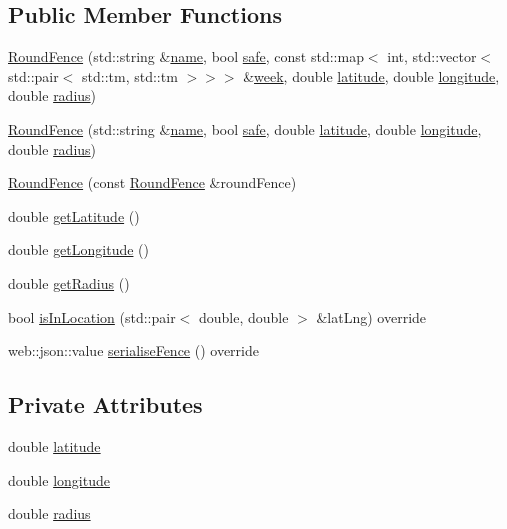 \subsection*{Public Member Functions}
\begin{DoxyCompactItemize}
\item 
\hyperlink{class_round_fence_afd452f0c483dbe4b328fc56723ae953c}{Round\+Fence} (std\+::string \&\hyperlink{class_fence_aa405676733f25812b38ea0dd9ccd1863}{name}, bool \hyperlink{class_fence_ad570430040eee657c625a67d5589c4b5}{safe}, const std\+::map$<$ int, std\+::vector$<$ std\+::pair$<$ std\+::tm, std\+::tm $>$$>$$>$ \&\hyperlink{class_fence_ae589e973fa03316847aeceedd72e2b64}{week}, double \hyperlink{class_round_fence_ad48cb4c95dab320652679bae203b7caf}{latitude}, double \hyperlink{class_round_fence_a122cccc61f294c1fcdf7ebe944944fca}{longitude}, double \hyperlink{class_round_fence_a8e9d1a2f22df0bb718522f3ab6cd3b83}{radius})
\item 
\hyperlink{class_round_fence_a99f4ab4cedbec39596633826e101f3d7}{Round\+Fence} (std\+::string \&\hyperlink{class_fence_aa405676733f25812b38ea0dd9ccd1863}{name}, bool \hyperlink{class_fence_ad570430040eee657c625a67d5589c4b5}{safe}, double \hyperlink{class_round_fence_ad48cb4c95dab320652679bae203b7caf}{latitude}, double \hyperlink{class_round_fence_a122cccc61f294c1fcdf7ebe944944fca}{longitude}, double \hyperlink{class_round_fence_a8e9d1a2f22df0bb718522f3ab6cd3b83}{radius})
\item 
\hyperlink{class_round_fence_ae2d9b747b35ee2c48587321e953b87df}{Round\+Fence} (const \hyperlink{class_round_fence}{Round\+Fence} \&round\+Fence)
\item 
double \hyperlink{class_round_fence_a5981188ace99620634c843cc42da9bfc}{get\+Latitude} ()
\item 
double \hyperlink{class_round_fence_a301944908bde9659847bf5048633ae9d}{get\+Longitude} ()
\item 
double \hyperlink{class_round_fence_a9a7eba297334bf868fd552654df1ad3c}{get\+Radius} ()
\item 
bool \hyperlink{class_round_fence_a4955bf0dbd168853ba9913465953865d}{is\+In\+Location} (std\+::pair$<$ double, double $>$ \&lat\+Lng) override
\item 
web\+::json\+::value \hyperlink{class_round_fence_ae9dd3e4291f7509ce557a6c28cdd682d}{serialise\+Fence} () override
\end{DoxyCompactItemize}
\subsection*{Private Attributes}
\begin{DoxyCompactItemize}
\item 
double \hyperlink{class_round_fence_ad48cb4c95dab320652679bae203b7caf}{latitude}
\item 
double \hyperlink{class_round_fence_a122cccc61f294c1fcdf7ebe944944fca}{longitude}
\item 
double \hyperlink{class_round_fence_a8e9d1a2f22df0bb718522f3ab6cd3b83}{radius}
\end{DoxyCompactItemize}


